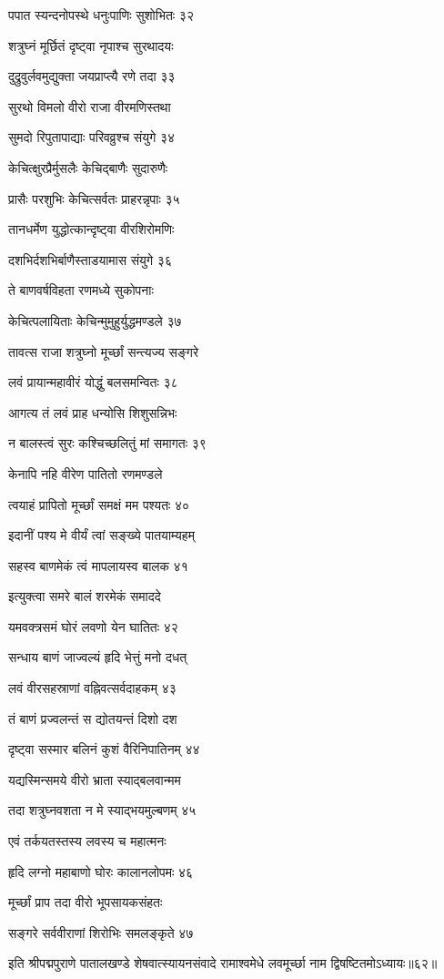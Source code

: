 पपात स्यन्दनोपस्थे धनुःपाणिः सुशोभितः ३२

शत्रुघ्नं मूर्छितं दृष्ट्वा नृपाश्च सुरथादयः

दुद्रुवुर्लवमुद्युक्ता जयप्राप्त्यै रणे तदा ३३

सुरथो विमलो वीरो राजा वीरमणिस्तथा

सुमदो रिपुतापाद्याः परिवव्रुश्च संयुगे ३४

केचित्क्षुरप्रैर्मुसलैः केचिद्बाणैः सुदारुणैः

प्रासैः परशुभिः केचित्सर्वतः प्राहरन्नृपाः ३५

तानधर्मेण युद्धोत्कान्दृष्ट्वा वीरशिरोमणिः

दशभिर्दशभिर्बाणैस्ताडयामास संयुगे ३६

ते बाणवर्षविहता रणमध्ये सुकोपनाः

केचित्पलायिताः केचिन्मुमुहुर्युद्धमण्डले ३७

तावत्स राजा शत्रुघ्नो मूर्च्छां सन्त्यज्य सङ्गरे

लवं प्रायान्महावीरं योद्धुं बलसमन्वितः ३८

आगत्य तं लवं प्राह धन्योसि शिशुसन्निभः

न बालस्त्वं सुरः कश्चिच्छलितुं मां समागतः ३९

केनापि नहि वीरेण पातितो रणमण्डले

त्वयाहं प्रापितो मूर्च्छां समक्षं मम पश्यतः ४०

इदानीं पश्य मे वीर्यं त्वां सङ्ख्ये पातयाम्यहम्

सहस्व बाणमेकं त्वं मापलायस्व बालक ४१

इत्युक्त्वा समरे बालं शरमेकं समाददे

यमवक्त्रसमं घोरं लवणो येन घातितः ४२

सन्धाय बाणं जाज्वल्यं हृदि भेत्तुं मनो दधत्

लवं वीरसहस्राणां वह्निवत्सर्वदाहकम् ४३

तं बाणं प्रज्वलन्तं स द्योतयन्तं दिशो दश

दृष्ट्वा सस्मार बलिनं कुशं वैरिनिपातिनम् ४४

यद्यस्मिन्समये वीरो भ्राता स्याद्बलवान्मम

तदा शत्रुघ्नवशता न मे स्याद्भयमुल्बणम् ४५

एवं तर्कयतस्तस्य लवस्य च महात्मनः

हृदि लग्नो महाबाणो घोरः कालानलोपमः ४६

मूर्च्छां प्राप तदा वीरो भूपसायकसंहतः

सङ्गरे सर्ववीराणां शिरोभिः समलङ्कृते ४७

इति श्रीपद्मपुराणे पातालखण्डे शेषवात्स्यायनसंवादे रामाश्वमेधे लवमूर्च्छा नाम द्विषष्टितमोऽध्यायः॥६२॥

